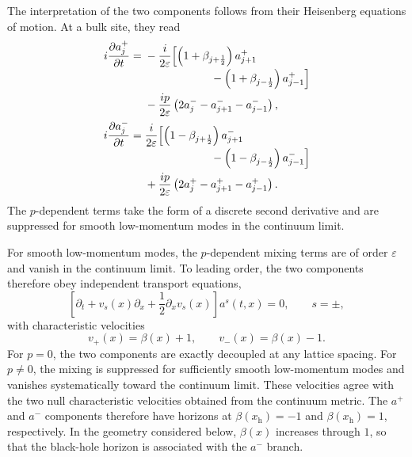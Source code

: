 \documentclass[reprint,amsmath,amssymb,aps,showkeys,superscriptaddress]{revtex4-2}
\begin{document}
The interpretation of the two components follows from their
Heisenberg equations of motion. At a bulk site, they read
\begin{subequations}
\label{eq:a_eom_lattice}
\begin{align}
  i\frac{\partial a_j^+}{\partial t}
  ={}&
  -\frac{i}{2\varepsilon}
  \Bigl[
    \left(
      1+\beta_{j+\frac12}
    \right)a_{j+1}^+
  \nonumber\\[-2pt]
  &\hspace{21mm}
    -
    \left(
      1+\beta_{j-\frac12}
    \right)a_{j-1}^+
  \Bigr]
  \nonumber\\
  &-
  \frac{i p}{2\varepsilon}
  \left(
    2a_j^-
    -a_{j+1}^-
    -a_{j-1}^-
  \right),
  \label{eq:a_plus_eom}
  \\
  i\frac{\partial a_j^-}{\partial t}
  ={}&
  \frac{i}{2\varepsilon}
  \Bigl[
    \left(
      1-\beta_{j+\frac12}
    \right)a_{j+1}^-
  \nonumber\\[-2pt]
  &\hspace{21mm}
    -
    \left(
      1-\beta_{j-\frac12}
    \right)a_{j-1}^-
  \Bigr]
  \nonumber\\
  &+
  \frac{i p}{2\varepsilon}
  \left(
    2a_j^+
    -a_{j+1}^+
    -a_{j-1}^+
  \right).
  \label{eq:a_minus_eom}
\end{align}
\end{subequations}
The $p$-dependent terms take the form of a discrete second
derivative and are suppressed for smooth low-momentum modes in the
continuum limit.

For smooth low-momentum modes, the $p$-dependent mixing terms are
of order $\varepsilon$ and vanish in the continuum limit. To leading
order, the two components therefore obey independent transport
equations,
\begin{equation}
  \left[
    \partial_t
    +v_s(x)\partial_x
    +\frac{1}{2}\partial_xv_s(x)
  \right]
  a^s(t,x)
  =
  0,
  \qquad
  s=\pm,
  \label{eq:continuum_transport}
\end{equation}
with characteristic velocities
\begin{equation}
  v_+(x)=\beta(x)+1,
  \qquad
  v_-(x)=\beta(x)-1.
  \label{eq:a_velocities}
\end{equation}
For $p=0$, the two components are exactly decoupled at any lattice
spacing. For $p\neq0$, the mixing is suppressed for sufficiently
smooth low-momentum modes and vanishes systematically toward the
continuum limit. These velocities agree with the two null
characteristic velocities obtained from the continuum metric. The
$a^+$ and $a^-$ components therefore have horizons at
$\beta(x_{\mathrm h})=-1$ and $\beta(x_{\mathrm h})=1$,
respectively. In the geometry considered below, $\beta(x)$ increases
through $1$, so that the black-hole horizon is associated with the
$a^-$ branch.
\end{document}

